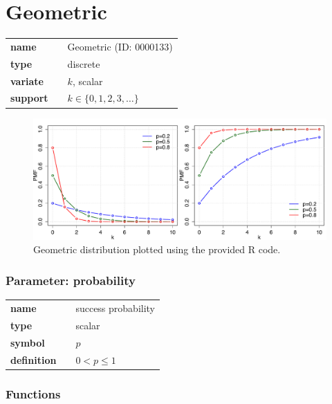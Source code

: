 \section*{Geometric} 

  \bigskip 

\begin{tabular}{p{2cm}cl}
\textbf{name} & & Geometric (ID: 0000133)\\ 
 
\textbf{type} & & discrete \\ 

\textbf{variate} & & $k
$, scalar \\ 

\textbf{support} & & $k \in \{0,1,2,3,\dots\}$
\end{tabular}

\begin{figure}[ht!]
\centering
  \includegraphics[width=140mm]{pics/Geometric.pdf}
 \caption{Geometric distribution plotted using the provided R code.}
 \label{fig:Geometric}
\end{figure}

\subsubsection*{Parameter: probability}

\noindent\begin{tabular}{p{2cm}cl}
\textbf{name} & & success probability \\
\textbf{type} & & scalar \\
\textbf{symbol} & & $p$  \\
\textbf{definition} & & $0< p \leq 1$
\end{tabular}
\subsubsection*{Functions}

